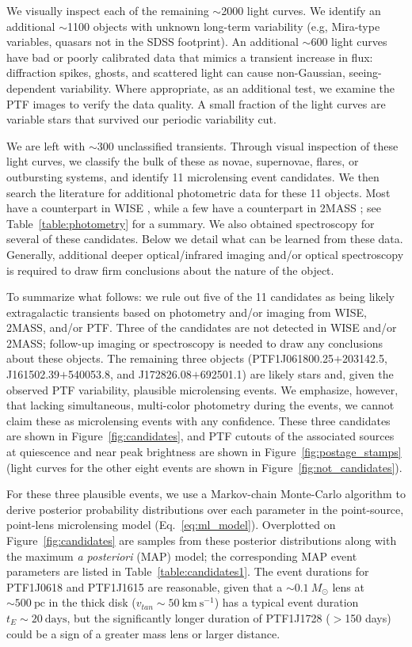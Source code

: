\documentclass{emulateapj}
\begin{document}
We visually inspect each of the remaining $\sim$2000 light curves. We identify an additional $\sim$1100 objects with unknown long-term variability (e.g, Mira-type variables, quasars not in the SDSS footprint). An additional $\sim$600 light curves have bad or poorly calibrated data that mimics a transient increase in flux: diffraction spikes, ghosts, and scattered light can cause non-Gaussian, seeing-dependent variability. Where appropriate, as an additional test, we examine the PTF images to verify the data quality. A small fraction of the light curves are variable stars that survived our periodic variability cut. 

We are left with $\sim$300 unclassified transients. Through visual inspection of these light curves, we classify the bulk of these as novae, supernovae, flares, or outbursting systems, and identify 11 microlensing event candidates. We then search the literature for additional photometric data for these 11 objects. Most have a counterpart in WISE \citep{WISE}, while a few have a counterpart in 2MASS \citep{cutri03}; see Table~\ref{table:photometry} for a summary. We also obtained spectroscopy for several of these candidates. Below we detail what can be learned from these data. Generally, additional deeper optical/infrared imaging and/or optical spectroscopy is required to draw firm conclusions about the nature of the object.

To summarize what follows: we rule out five of the 11 candidates as being likely extragalactic transients based on photometry and/or imaging from WISE, 2MASS, and/or PTF. Three of the candidates are not detected in WISE and/or 2MASS; follow-up imaging or spectroscopy is needed to draw any conclusions about these objects. The remaining three objects (PTF1J061800.25$+$203142.5, J161502.39$+$540053.8, and J172826.08$+$692501.1) are likely stars and, given the observed PTF variability, plausible microlensing events. We emphasize, however, that lacking simultaneous, multi-color photometry during the events, we cannot claim these as microlensing events with any confidence. These three candidates are shown in Figure~\ref{fig:candidates}, and PTF cutouts of the associated sources at quiescence and near peak brightness are shown in Figure~\ref{fig:postage_stamps} (light curves for the other eight events are shown in Figure~\ref{fig:not_candidates}).

For these three plausible events, we use a Markov-chain Monte-Carlo algorithm \citep{goodman, dfm} to derive posterior probability distributions over each parameter in the point-source, point-lens microlensing model (Eq.~\ref{eq:ml_model}). Overplotted on Figure~\ref{fig:candidates} are samples from these posterior distributions along with the maximum {\it a posteriori} (MAP) model; the corresponding MAP event parameters are listed in Table~\ref{table:candidates1}. The event durations for PTF1J0618 and PTF1J1615 are reasonable, given that a ${\sim}0.1\ M_\odot$ lens at ${\sim}500~\mathrm{pc}$ in the thick disk ($v_{tan}\sim 50~\mathrm{km}~\mathrm{s}^{-1}$) has a typical event duration $t_E \sim 20~\mathrm{days}$, but the significantly longer duration of PTF1J1728 ($>$150 days) could be a sign of a greater mass lens or larger distance.
\end{document}
